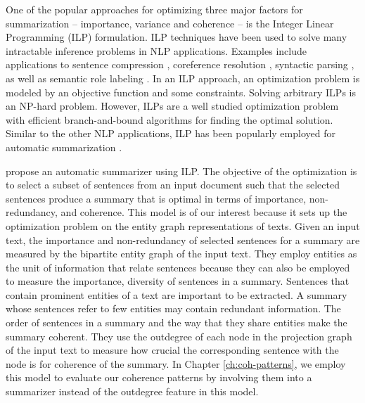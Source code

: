 One of the popular approaches for optimizing three major factors for summarization -- importance, variance and coherence -- is the Integer Linear Programming (ILP) formulation. 
ILP techniques have been used to solve many intractable inference problems in NLP applications. 
Examples include applications to sentence compression \cite{clarke10,filippova13}, coreference resolution \cite{denis09},  syntactic parsing \cite{klenner07a}, as well as semantic role labeling \cite{punyakanok04b}.
In an ILP approach, an optimization problem is modeled by an objective function and some constraints. 
Solving arbitrary ILPs is an \mbox{NP-hard} problem. 
However, ILPs are a well studied optimization problem with efficient \mbox{branch-and-bound} algorithms for finding the optimal solution. 
Similar to the other NLP applications, ILP has been popularly employed for automatic summarization 
\cite{nishikawa10,galanis12,marciniak05b,mcdonald07,bergkirkpatrick11,woodsend12,lichen13a,hirao13}.  

 propose an automatic summarizer using ILP.  
The objective of the optimization is to select a subset of sentences from an input document such that the selected sentences produce a summary that is optimal in terms of importance, non-redundancy, and coherence. 
This model is of our interest because it sets up the optimization problem on the entity graph representations of texts. 
Given an input text, the importance and non-redundancy of selected sentences for a summary are measured by the bipartite entity graph of the input text. 
They employ entities as the unit of information that relate sentences because they can also be employed to measure the importance, diversity of sentences in a summary. 
Sentences that contain prominent entities of a text are important to be extracted. 
A summary whose sentences refer to few entities may contain redundant information. 
The order of sentences in a summary and the way that they share entities make the summary coherent. 
They use the outdegree of each node in the projection graph of the input text to measure how crucial the corresponding sentence with the node is for coherence of the summary.  
In Chapter \ref{ch:coh-patterns}, we employ this model to evaluate our coherence patterns by involving them into a summarizer instead of the outdegree feature in this model. 

